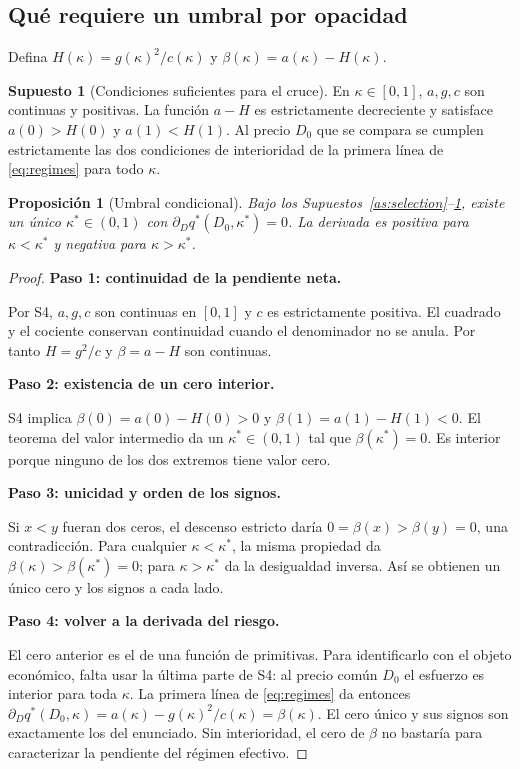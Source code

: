 \documentclass[11pt]{article}
\newtheorem{proposition}{Proposición}
\theoremstyle{definition}\newtheorem{assumption}{Supuesto}
\begin{document}
\subsection{Qué requiere un umbral por opacidad}
Defina $H(\kappa)=g(\kappa)^2/c(\kappa)$ y
$\beta(\kappa)=a(\kappa)-H(\kappa)$.
\begin{assumption}[Condiciones suficientes para el cruce]\label{as:cross}
En $\kappa\in[0,1]$, $a,g,c$ son continuas y positivas. La función
$a-H$ es estrictamente decreciente y satisface $a(0)>H(0)$ y $a(1)<H(1)$.
Al precio $D_0$ que se compara se cumplen estrictamente las dos condiciones
de interioridad de la primera línea de \eqref{eq:regimes} para todo $\kappa$.
\end{assumption}
\begin{proposition}[Umbral condicional]\label{p:threshold}
Bajo los Supuestos~\ref{as:selection}--\ref{as:cross}, existe un único
$\kappa^*\in(0,1)$ con $\partial_Dq^*(D_0,\kappa^*)=0$. La derivada es
positiva para $\kappa<\kappa^*$ y negativa para $\kappa>\kappa^*$.
\end{proposition}
\begin{proof}
\textbf{Paso 1: continuidad de la pendiente neta.}\par
Por S4, $a,g,c$ son continuas en $[0,1]$ y $c$ es estrictamente positiva.
El cuadrado y el cociente conservan continuidad cuando el denominador no se
anula. Por tanto $H=g^2/c$ y $\beta=a-H$ son continuas.

\textbf{Paso 2: existencia de un cero interior.}\par
S4 implica $\beta(0)=a(0)-H(0)>0$ y $\beta(1)=a(1)-H(1)<0$. El teorema
del valor intermedio da un $\kappa^*\in(0,1)$ tal que $\beta(\kappa^*)=0$.
Es interior porque ninguno de los dos extremos tiene valor cero.

\textbf{Paso 3: unicidad y orden de los signos.}\par
Si $x<y$ fueran dos ceros, el descenso estricto daría
$0=\beta(x)>\beta(y)=0$, una contradicción. Para cualquier
$\kappa<\kappa^*$, la misma propiedad da
$\beta(\kappa)>\beta(\kappa^*)=0$; para $\kappa>\kappa^*$ da la desigualdad
inversa. Así se obtienen un único cero y los signos a cada lado.

\textbf{Paso 4: volver a la derivada del riesgo.}\par
El cero anterior es el de una función de primitivas. Para identificarlo
con el objeto económico, falta usar la última parte de S4: al precio común
$D_0$ el esfuerzo es interior para toda $\kappa$. La primera línea de
\eqref{eq:regimes} da entonces
$\partial_Dq^*(D_0,\kappa)=a(\kappa)-g(\kappa)^2/c(\kappa)=\beta(\kappa)$.
El cero único y sus signos son exactamente los del enunciado. Sin
interioridad, el cero de $\beta$ no bastaría para caracterizar la pendiente
del régimen efectivo.
\end{proof}
\end{document}
